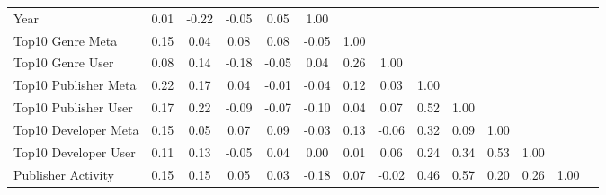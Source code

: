 \documentclass{article}
\begin{document}
{\begin{table}[htbp]
{\begin{tabular}{l*{13}{c}}
Year         &        0.01         &       -0.22\sym{***}&       -0.05\sym{***}&        0.05\sym{***}&        1.00         &                     &                     &                     &                     &                     &                     &                     &                     \\
Top10 Genre Meta&        0.15\sym{***}&        0.04\sym{**} &        0.08\sym{***}&        0.08\sym{***}&       -0.05\sym{***}&        1.00         &                     &                     &                     &                     &                     &                     &                     \\
Top10 Genre User&        0.08\sym{***}&        0.14\sym{***}&       -0.18\sym{***}&       -0.05\sym{***}&        0.04\sym{***}&        0.26\sym{***}&        1.00         &                     &                     &                     &                     &                     &                     \\
Top10 Publisher Meta&        0.22\sym{***}&        0.17\sym{***}&        0.04\sym{***}&       -0.01         &       -0.04\sym{***}&        0.12\sym{***}&        0.03\sym{*}  &        1.00         &                     &                     &                     &                     &                     \\
Top10 Publisher User&        0.17\sym{***}&        0.22\sym{***}&       -0.09\sym{***}&       -0.07\sym{***}&       -0.10\sym{***}&        0.04\sym{***}&        0.07\sym{***}&        0.52\sym{***}&        1.00         &                     &                     &                     &                     \\
Top10 Developer Meta&        0.15\sym{***}&        0.05\sym{***}&        0.07\sym{***}&        0.09\sym{***}&       -0.03\sym{*}  &        0.13\sym{***}&       -0.06\sym{***}&        0.32\sym{***}&        0.09\sym{***}&        1.00         &                     &                     &                     \\
Top10 Developer User&        0.11\sym{***}&        0.13\sym{***}&       -0.05\sym{***}&        0.04\sym{***}&        0.00         &        0.01         &        0.06\sym{***}&        0.24\sym{***}&        0.34\sym{***}&        0.53\sym{***}&        1.00         &                     &                     \\
Publisher Activity&        0.15\sym{***}&        0.15\sym{***}&        0.05\sym{***}&        0.03\sym{*}  &       -0.18\sym{***}&        0.07\sym{***}&       -0.02\sym{*}  &        0.46\sym{***}&        0.57\sym{***}&        0.20\sym{***}&        0.26\sym{***}&        1.00         &                     \\

\end{tabular}}
\end{table}}
\end{document}
